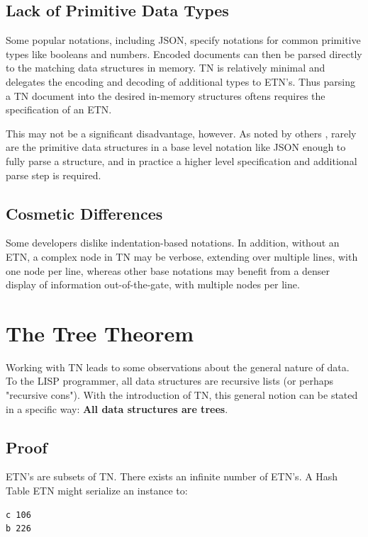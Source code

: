 \documentclass[journal]{IEEEtran}
\begin{document}
\subsection{Lack of Primitive Data Types}

Some popular notations, including JSON, specify notations for common primitive types like booleans and numbers. Encoded documents can then be parsed directly to the matching data structures in memory. TN is relatively minimal and delegates the encoding and decoding of additional types to ETN's. Thus parsing a TN document into the desired in-memory structures oftens requires the specification of an ETN.

This may not be a significant disadvantage, however. As noted by others \cite{Ooms}, rarely are the primitive data structures in a base level notation like JSON enough to fully parse a structure, and in practice a higher level specification and additional parse step is required.

\subsection{Cosmetic Differences}

Some developers dislike indentation-based notations. In addition, without an ETN, a complex node in TN may be verbose, extending over multiple lines, with one node per line, whereas other base notations may benefit from a denser display of information out-of-the-gate, with multiple nodes per line.

\section{The Tree Theorem}

Working with TN leads to some observations about the general nature of data. To the LISP programmer, all data structures are recursive lists (or perhaps "recursive cons"). With the introduction of TN, this general notion can be stated in a specific way: \textbf{All data structures are trees}.

\subsection{Proof}

ETN's are subsets of TN. There exists an infinite number of ETN's. A Hash Table ETN might serialize an instance to:

\begin{lstlisting}
c 106
b 226
\end{lstlisting}
\end{document}
